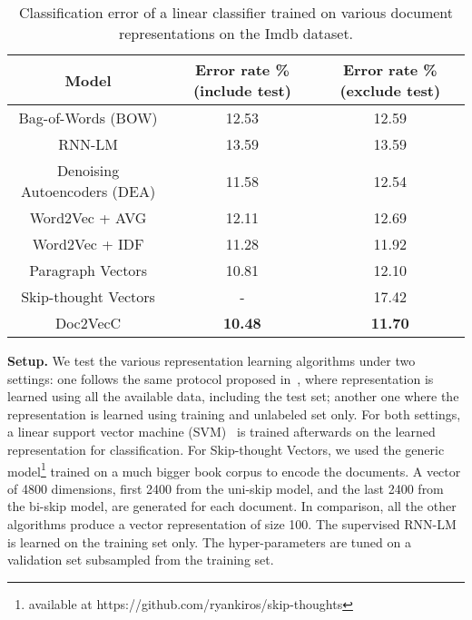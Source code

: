 \documentclass{article} \usepackage{iclr2017_conference,times}
\newcommand{\name}{Doc2VecC}
\begin{document}
\begin{table}
\caption{Classification error of a linear classifier trained on various document representations on the Imdb dataset. }
\label{tbl:sentiment}
\centering
\begin{tabular}{|c||c|c|}
\hline
Model &  Error rate \% (include test) & Error rate \% (exclude test)\\
\hline
\hline
Bag-of-Words (BOW) & 12.53  & 12.59\\
\hline
RNN-LM  & 13.59 & 13.59\\
\hline
Denoising Autoencoders (DEA) & 11.58 & 12.54\\
\hline
Word2Vec + AVG  & 12.11 &  12.69\\
Word2Vec + IDF & 11.28 & 11.92\\
\hline
Paragraph Vectors & 10.81 & 12.10 \\
\hline
Skip-thought Vectors & - & 17.42  \\
\hline
\name &  \textbf{10.48} & \textbf{11.70} \\
\hline
\end{tabular}
\end{table}

\textbf{Setup.} We test the various representation learning algorithms under two settings: one follows the same protocol proposed in~\citep{mesnil2014ensemble}, where representation is learned using all the available data, including the test set; another one where the representation is learned using training and unlabeled set only.  For both settings,  a linear support vector machine (SVM)~\citep{fan2008liblinear} is trained afterwards on the learned representation for classification.  For Skip-thought Vectors, we used the generic model\footnote{available at https://github.com/ryankiros/skip-thoughts} trained on a much bigger book corpus to encode the documents. A vector of 4800 dimensions, first 2400 from the uni-skip model, and the last 2400 from the bi-skip model, are generated for each document. In comparison, all the other algorithms produce a vector representation of size 100. The supervised RNN-LM is learned on the training set only. The hyper-parameters are tuned on a validation set subsampled from the training set. 
\end{document}
